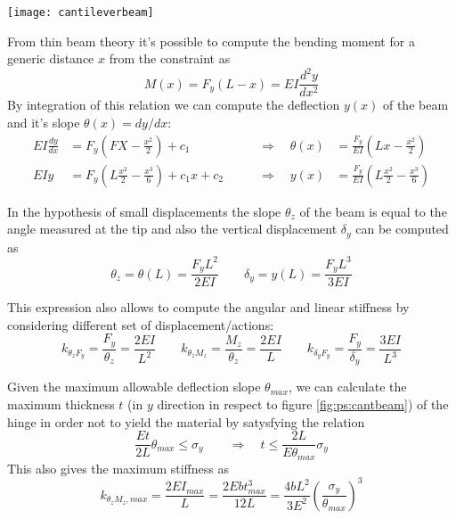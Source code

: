 	\begin{SCfigure}[1][bht]
		\centering \texttt{[image: cantileverbeam]}
		\caption{leaf spring model of the flexure hinge as a cantilever beam.}
		\label{fig:ps:cantbeam}
	\end{SCfigure}
	
	From  thin beam theory it's possible to compute the bending moment for a generic distance $x$ from the constraint as
	\[ M(x) = F_y (L-x) = EI \frac{d^2y}{dx^2} \]
	By integration of this relation we can compute the deflection $y(x)$ of the beam and it's slope $\theta(x) = dy/dx$:
	\begin{equation}
	\begin{aligned}
		EI \frac{dy}{dx} & = F_y \left( FX - \frac{x^2}{2} \right) + c_1 \qquad & \Rightarrow \quad \theta(x) &= \frac{F_y}{EI} \left(Lx - \frac{x^2}{2}\right) \\
		EI y & = F_y \left(L\frac{x^2}{2} - \frac{x^3}{6}\right) +c_1 x + c_2\qquad & \Rightarrow \quad y(x) &= \frac{F_y}{EI} \left(L\frac{x^2}{2} - \frac{x^3}{6}\right) 		
	\end{aligned}
	\end{equation}

	In the hypothesis of small displacements the slope $\theta_z$ of the beam is equal to the angle measured at the tip and also the vertical displacement $\delta_y$ can be computed as
	\begin{equation}
		\theta_z = \theta(L) = \frac{F_y L^2}{2EI} \qquad \delta_y = y(L) = \frac{F_yL^3}{3EI}
	\end{equation}
	
	This expression also allows to compute the angular and linear stiffness by considering different set of displacement/actions:
	\begin{equation}
		k_{\theta_zF_y} = \frac{F_y}{\theta_z} = \frac{2EI}{L^2} \qquad k_{\theta_zM_z} = \frac{M_z}{\theta_z} = \frac{2EI}{L} \qquad k_{\delta_y F_y} = \frac{F_y}{\delta_y} = \frac{3EI}{L^3}
	\end{equation}
	
	Given the maximum allowable deflection slope $\theta_{max}$, we can calculate the maximum thickness $t$ (in $y$ direction in respect to figure \ref{fig:ps:cantbeam}) of the hinge in order not to yield the material by satysfying the relation
	\begin{equation}
		\frac{Et}{2L} \theta_{max} \leq \sigma_y \qquad \Rightarrow \quad t \leq \frac{2L}{E\theta_{max}} \sigma_y
	\end{equation}
	This also gives the maximum stiffness as 
	\[ k_{\theta_zM_z,max} = \frac{2EI_{max}}{L} = \frac{2Ebt^3_{max}}{12L} = \frac{4bL^2}{3E^2}\left(\frac{\sigma_y}{\theta_{max}}\right)^3 \]
	
